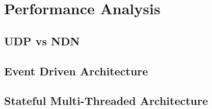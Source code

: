 \documentclass{sig-alternate}
\renewcommand\_{\textunderscore\allowbreak}  %
\begin{document}
\section{Performance Analysis}

\subsection{UDP vs NDN}

\subsection{Event Driven Architecture}

\subsection{Stateful Multi-Threaded Architecture}

%
\end{document}
